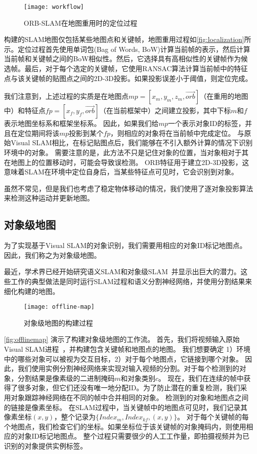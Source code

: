\begin{figure}[htbp]
  \centering
  \texttt{[image: workflow]}
  \caption{ORB-SLAM\cite{mur2017orb}在地图重用时的定位过程}
  \label{fig:localization}
\end{figure}

构建的SLAM地图\cite{mur2017orb}仅包括某些地图点和关键帧，地图重用过程如\autoref{fig:localization}所示。定位过程首先使用单词包(Bag of Words, BoW)\cite{galvez2012bags}计算当前帧的表示，然后计算当前帧和关键帧之间的BoW相似性。然后，它选择具有高相似性的关键帧作为候选帧。最后，对于每个选定的关键帧，它使用RANSAC\cite{derpanis2010overview}算法计算当前帧中的特征点与该关键帧的贴图点之间的2D-3D投影。如果投影误差小于阈值，则定位完成。

我们注意到，上述过程的实质是在地图点$mp = [x_m,y_m,z_m,\vec{orb}]$（在重用的地图中）和特征点$fp = [x_f,y_f,\vec{orb}]$（在当前框架中）之间建立投影，其中下标$m$和$f$表示地图坐标系和框架坐标系。
因此，如果我们给$mp$一个表示对象ID的标签，并且在定位期间将该$mp$投影到某个$fp$，则相应的对象将在当前帧中完成定位。
与原始Visual SLAM相比，在标记贴图点后，我们能够在不引入额外计算的情况下识别环境中的对象。
需要注意的是，此方法不只是记住对象的位置，当对象相对于其在地图上的位置移动时，可能会导致误检测。
ORB特征用于建立2D-3D投影，这意味着SLAM在环境中定位自身后，当某些特征点可见时，它会识别到对象。

虽然不常见，但是我们也考虑了稳定物体移动的情况，我们使用了逐对象投影算法来检测这种运动并更新地图。


\subsection{对象级地图}
\label{sec:map}
为了实现基于Visual SLAM的对象识别，我们需要用相应的对象ID标记地图点。因此，我们称之为对象级地图。

最近，学术界已经开始研究语义SLAM\cite{bowman2017probabilistic,kaneko2018mask}和对象级SLAM~\cite{mccormac2018fusion++,strecke2019fusion}并显示出巨大的潜力。这些工作的典型做法是同时运行SLAM过程和语义分割神经网络，并使用分割结果来细化构建的地图。

\begin{figure}[htbp]
	\centering
	\texttt{[image: offline-map]}
	\caption{对象级地图的构建过程}
	\label{fig:offlinemap}
\end{figure}

\autoref{fig:offlinemap} 演示了构建对象级地图的工作流。
首先，我们将视频输入原始Visual SLAM进程~\cite{mur2017orb}，并构建包含关键帧和地图点的地图。
我们想要确定 1）环境中的哪些对象可以被视为交互目标，2）对于每个地图点，它链接到哪个对象。
因此，我们使用实例分割神经网络\cite{He_2017_ICCV}来实现对输入视频的分割。对于每个检测到的对象，分割结果是像素级的二进制掩码$m$和对象类别$c$。
现在，我们在连续的帧中获得了很多对象，但它们还没有唯一地分配ID。为了防止潜在的重复检测，我们采用对象跟踪神经网络在不同的帧中合并相同的对象。
检测到的对象和地图点之间的链接是像素坐标。
在SLAM过程中，当关键帧中的地图点可见时，我们记录其像素坐标$(x,y)$，整个记录为$\{Index_m,Index_{kf}, (x,y)\}$。
对于每个关键帧的每个地图点，我们检查它们的坐标。如果坐标位于该关键帧的对象掩码内，则使用相应的对象ID标记地图点。
整个过程只需要很少的人工工作量，即拍摄视频并为已识别的对象提供实例标签。

